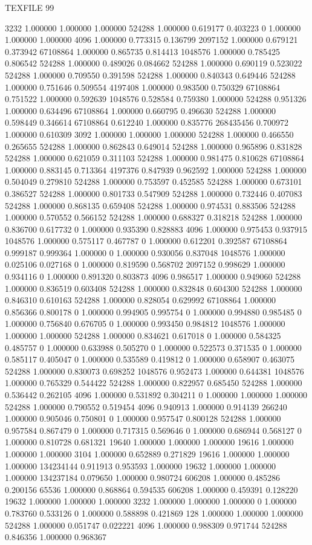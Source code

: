 TEXFILE
99

3232 1.000000 1.000000 1.000000
524288 1.000000 0.619177 0.403223
0 1.000000 1.000000 1.000000
4096 1.000000 0.773315 0.136799
2097152 1.000000 0.679121 0.373942
67108864 1.000000 0.865735 0.814413
1048576 1.000000 0.785425 0.806542
524288 1.000000 0.489026 0.084662
524288 1.000000 0.690119 0.523022
524288 1.000000 0.709550 0.391598
524288 1.000000 0.840343 0.649446
524288 1.000000 0.751646 0.509554
4197408 1.000000 0.983500 0.750329
67108864 0.751522 1.000000 0.592639
1048576 0.528584 0.759380 1.000000
524288 0.951326 1.000000 0.634496
67108864 1.000000 0.660795 0.496630
524288 1.000000 0.598449 0.346614
67108864 0.612240 1.000000 0.835776
268435456 0.700972 1.000000 0.610309
3092 1.000000 1.000000 1.000000
524288 1.000000 0.466550 0.265655
524288 1.000000 0.862843 0.649014
524288 1.000000 0.965896 0.831828
524288 1.000000 0.621059 0.311103
524288 1.000000 0.981475 0.810628
67108864 1.000000 0.883145 0.713364
4197376 0.847939 0.962592 1.000000
524288 1.000000 0.504049 0.279810
524288 1.000000 0.753597 0.452585
524288 1.000000 0.673101 0.386527
524288 1.000000 0.801733 0.547909
524288 1.000000 0.732446 0.407083
524288 1.000000 0.868135 0.659408
524288 1.000000 0.974531 0.883506
524288 1.000000 0.570552 0.566152
524288 1.000000 0.688327 0.318218
524288 1.000000 0.836700 0.617732
0 1.000000 0.935390 0.828883
4096 1.000000 0.975453 0.937915
1048576 1.000000 0.575117 0.467787
0 1.000000 0.612201 0.392587
67108864 0.999187 0.999364 1.000000
0 1.000000 0.930056 0.837048
1048576 1.000000 0.025106 0.027168
0 1.000000 0.819590 0.568702
2097152 0.998629 1.000000 0.934116
0 1.000000 0.891320 0.803873
4096 0.986517 1.000000 0.949060
524288 1.000000 0.836519 0.603408
524288 1.000000 0.832848 0.604300
524288 1.000000 0.846310 0.610163
524288 1.000000 0.828054 0.629992
67108864 1.000000 0.856366 0.800178
0 1.000000 0.994905 0.995754
0 1.000000 0.994880 0.985485
0 1.000000 0.756840 0.676705
0 1.000000 0.993450 0.984812
1048576 1.000000 1.000000 1.000000
524288 1.000000 0.834621 0.617018
0 1.000000 0.584325 0.485757
0 1.000000 0.633988 0.505270
0 1.000000 0.522573 0.371535
0 1.000000 0.585117 0.405047
0 1.000000 0.535589 0.419812
0 1.000000 0.658907 0.463075
524288 1.000000 0.830073 0.698252
1048576 0.952473 1.000000 0.644381
1048576 1.000000 0.765329 0.544422
524288 1.000000 0.822957 0.685450
524288 1.000000 0.536442 0.262105
4096 1.000000 0.531892 0.304211
0 1.000000 1.000000 1.000000
524288 1.000000 0.790552 0.519454
4096 0.940913 1.000000 0.914139
266240 1.000000 0.905046 0.750801
0 1.000000 0.957547 0.800128
524288 1.000000 0.957584 0.867479
0 1.000000 0.717315 0.569646
0 1.000000 0.686944 0.568127
0 1.000000 0.810728 0.681321
19640 1.000000 1.000000 1.000000
19616 1.000000 1.000000 1.000000
3104 1.000000 0.652889 0.271829
19616 1.000000 1.000000 1.000000
134234144 0.911913 0.953593 1.000000
19632 1.000000 1.000000 1.000000
134237184 0.079650 1.000000 0.980724
606208 1.000000 0.485286 0.200156
65536 1.000000 0.868864 0.594535
606208 1.000000 0.459391 0.128220
19632 1.000000 1.000000 1.000000
3232 1.000000 1.000000 1.000000
0 1.000000 0.783760 0.533126
0 1.000000 0.588898 0.421869
128 1.000000 1.000000 1.000000
524288 1.000000 0.051747 0.022221
4096 1.000000 0.988309 0.971744
524288 0.846356 1.000000 0.968367
